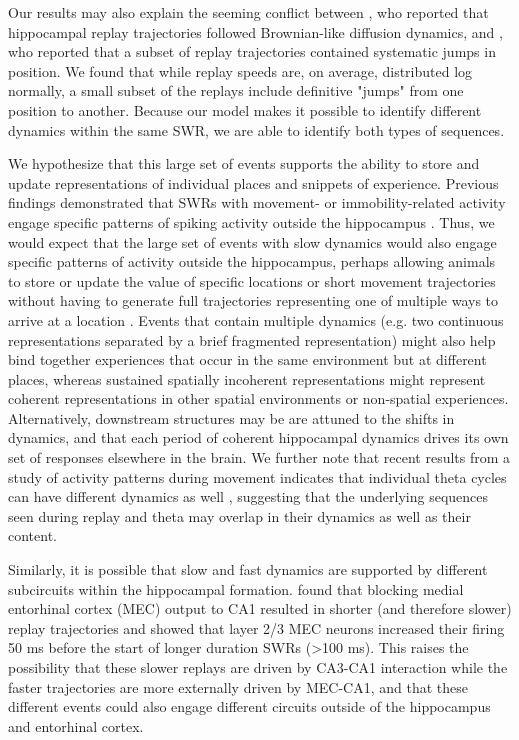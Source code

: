 \documentclass[9pt,lineno]{elife}
\begin{document}
Our results may also explain the seeming conflict between \cite{StellaHippocampalReactivationRandom2019}, who reported that hippocampal replay trajectories followed Brownian-like diffusion dynamics, and \cite{PfeifferAutoassociativedynamicsgeneration2015}, who reported that a subset of replay trajectories contained systematic jumps in position. We found that while replay speeds are, on average, distributed log normally, a small subset of the replays include definitive "jumps" from one position to another. Because our model makes it possible to identify different dynamics within the same SWR, we are able to identify both types of sequences.

We hypothesize that this large set of events supports the ability to store and update representations of individual places and snippets of experience. Previous findings demonstrated that SWRs with movement- or immobility-related activity engage specific patterns of spiking activity outside the hippocampus \citep{YuDistincthippocampalcorticalmemory2017, JadhavCoordinatedExcitationInhibition2016}. Thus, we would expect that the large set of events with slow dynamics would also engage specific patterns of activity outside the hippocampus, perhaps allowing animals to store or update the value of specific locations or short movement trajectories without having to generate full trajectories representing one of multiple ways to arrive at a location \citep{YuHippocampalcorticalinteraction2015}. Events that contain multiple dynamics (e.g. two continuous representations separated by a brief fragmented representation) might also help bind together experiences that occur in the same environment but at different places, whereas sustained spatially incoherent representations might represent coherent representations in other spatial environments \citep{KarlssonAwakereplayremote2009} or non-spatial experiences. Alternatively, downstream structures may be are attuned to the shifts in dynamics, and that each period of coherent hippocampal dynamics drives its own set of responses elsewhere in the brain. We further note that recent results from a study of activity patterns during movement indicates that individual theta cycles can have different dynamics as well \citep{WangAlternatingsequencesfuture2020a}, suggesting that the underlying sequences seen during replay and theta may overlap in their dynamics as well as their content.

Similarly, it is possible that slow and fast dynamics are supported by different subcircuits within the hippocampal formation. \cite{YamamotoDirectMedialEntorhinal2017} found that blocking medial entorhinal cortex (MEC) output to CA1 resulted in shorter (and therefore slower) replay trajectories and \cite{OlivaOriginGammaFrequency2018} showed that layer 2/3 MEC neurons increased their firing 50 ms before the start of longer duration SWRs (>100 ms). This raises the possibility that these slower replays are driven by CA3-CA1 interaction while the faster trajectories are more externally driven by MEC-CA1, and that these different events could also engage different circuits outside of the hippocampus and entorhinal cortex.
\end{document}
